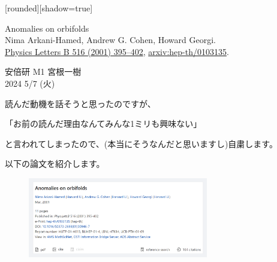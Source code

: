 \documentclass[
  unicode,a4paper,9pt,
  xcolor = {dvipsnames,svgnames},
  hyperref ={colorlinks=true,citecolor=Navy,linkcolor=NavyBlue,urlcolor=purple},
  ja=standard,lualatex
]{beamer}
\begin{document}
\nocite{Arkani-Hamed:2001uol}

\begin{frame}

  [rounded][shadow=true]
  \begin{block}{}
    \vspace*{5pt}

    \centering\Large
    Anomalies on orbifolds
    \\
    \normalsize
    Nima Arkani-Hamed, Andrew G. Cohen, Howard Georgi.
    \\
    \small
    \href{https://doi.org/10.1016/S0370-2693(01)00946-7}{Physics Letters B 516 (2001) 395–402},
    \href{https://doi.org/10.48550/arXiv.hep-th/0103135}{arxiv:hep-th/0103135}.

    \vspace*{5pt}
  \end{block}

  \begin{center}
    安倍研 M1 宮根一樹\\
    2024 5/7 (火)
  \end{center}

\end{frame}


\begin{frame}

  読んだ動機を話そうと思ったのですが、\pause
  \begin{center}
    「お前の読んだ理由なんてみんな1ミリも興味ない」
  \end{center}
  と言われてしまったので、(本当にそうなんだと思いますし)自粛します。

  \vspace*{10pt}

  以下の論文を紹介します\cite{Arkani-Hamed:2001uol}。
  \begin{figure}[ht]
    \centering
    \includegraphics[width=0.7\textwidth]{fig/Arkani-Hamed2001uol.png}
  \end{figure}


\end{frame}
\end{document}
